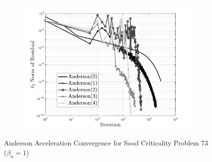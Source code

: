 \begin{figure}[!htbp]
\centering
\begin{subfigure}{\textwidth}
  \centering
  \includegraphics[width=.9\linewidth]{Figures/AndersonAcceleration/SoodProb73}
\end{subfigure}
\caption{Anderson Acceleration Convergence for Sood Criticality Problem 73 ($\beta_{n} = 1$)}
\label{fig:AASoodProb73}
\end{figure}


